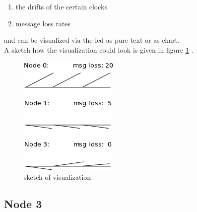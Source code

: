 \begin{enumerate}
 \item the drifts of the certain clocks
 \item message loss rates
\end{enumerate}

and can be visualized via the lcd as pure text or as chart.\\

A sketch how the visualization could look is given in figure \ref{fig:app:specification:node2} .

\begin{figure}[t]
 \centering
 \includegraphics[scale=0.8]{../images/app_visu_sketch.png}
 \caption{sketch of visualization}
 \label{fig:app:specification:node2}
\end{figure}


\subsection{Node 3}
\label{sec:app:specification:node3}

